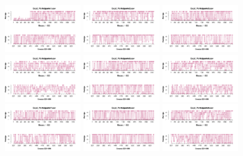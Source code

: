 \begin{figure}[th]
\centering
\includegraphics[width=0.30\textwidth]{Figures/Rating_Exp2_P1} \includegraphics[width=0.30\textwidth]{Figures/Rating_Exp2_P2} \includegraphics[width=0.30\textwidth]{Figures/Rating_Exp2_P3}
\includegraphics[width=0.30\textwidth]{Figures/Rating_Exp2_P4} \includegraphics[width=0.30\textwidth]{Figures/Rating_Exp2_P5} \includegraphics[width=0.30\textwidth]{Figures/Rating_Exp2_P6}
\includegraphics[width=0.30\textwidth]{Figures/Rating_Exp2_P7} \includegraphics[width=0.30\textwidth]{Figures/Rating_Exp2_P8} \includegraphics[width=0.30\textwidth]{Figures/Rating_Exp2_P9}

\end{figure}
